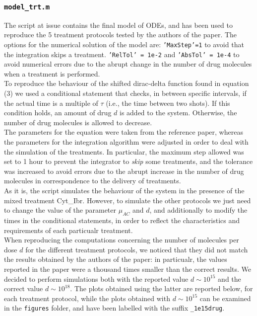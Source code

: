 \subsubsection{\texttt{model\_trt.m}}
The script at issue contains the final model of ODEs, and has been used to reproduce the 5 treatment protocols tested by the authors of the paper. The options for the numerical solution of the model are: \texttt{'MaxStep'=1} to avoid that the integration skips a treatment. \texttt{'RelTol' = 1e-2} and \texttt{'AbsTol' = 1e-4} to avoid numerical errors due to the abrupt change in the number of drug molecules when a treatment is performed.\\
To reproduce the behaviour of the shifted dirac-delta function found in equation (3) we used a conditional statement that checks, in between specific intervals, if the actual time is a multiple of $\tau$ (i.e., the time between two shots). If this condition holds, an amount of drug $d$ is added to the system. Otherwise, the number of drug molecules is allowed to decrease.\\
The parameters for the equation were taken from the reference paper, whereas the parameters for the integration algorithm were adjusted in order to deal with the simulation of the treatments. In particular, the maximum step allowed was set to 1 hour to prevent the integrator to \textit{skip} some treatments, and the tolerance was increased to avoid errors due to the abrupt increase in the number of drug molecules in correspondence to the delivery of treatments.\\
As it is, the script simulates the behaviour of the system in the presence of the mixed treatment Cyt\_Ibr. However, to simulate the other protocols we just need to change the value of the parameter $\mu_{AC}$ and $d$, and additionally to modify the times in the conditional statements, in order to reflect the characteristics and requirements of each particualr treatment. \\
When reproducing the computations concerning the number of molecules per dose $d$ for the different treatment protocols, we noticed that they did not match the results obtained by the authors of the paper: in particualr, the values reported in the paper were a thousand times smaller than the correct results. We decided to perform simulations both with the reported value $d \sim 10^{15}$ and the correct value $d \sim 10^{18}$. The plots obtained using the latter are reported below, for each treatment protocol, while the plots obtained with $d \sim 10^{15}$ can be examined in the \texttt{figures} folder, and have been labelled with the suffix \texttt{\_1e15drug}. \\
